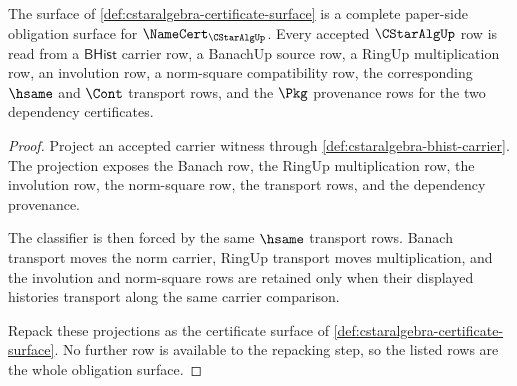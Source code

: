 \begin{theorem}
\label{thm:cstaralgebra-namecert-obligation-surface}
The surface of \autoref{def:cstaralgebra-certificate-surface} is a complete paper-side obligation surface for $\NameCert_{\CStarAlgUp}$. Every accepted $\CStarAlgUp$ row is read from a $\mathsf{BHist}$ carrier row, a BanachUp source row, a RingUp multiplication row, an involution row, a norm-square compatibility row, the corresponding $\hsame$ and $\Cont$ transport rows, and the $\Pkg$ provenance rows for the two dependency certificates.
\end{theorem}
\begin{proof}
Project an accepted carrier witness through \autoref{def:cstaralgebra-bhist-carrier}. The projection exposes the Banach row, the RingUp multiplication row, the involution row, the norm-square row, the transport rows, and the dependency provenance.

The classifier is then forced by the same $\hsame$ transport rows. Banach transport moves the norm carrier, RingUp transport moves multiplication, and the involution and norm-square rows are retained only when their displayed histories transport along the same carrier comparison.

Repack these projections as the certificate surface of \autoref{def:cstaralgebra-certificate-surface}. No further row is available to the repacking step, so the listed rows are the whole obligation surface.
\end{proof}

